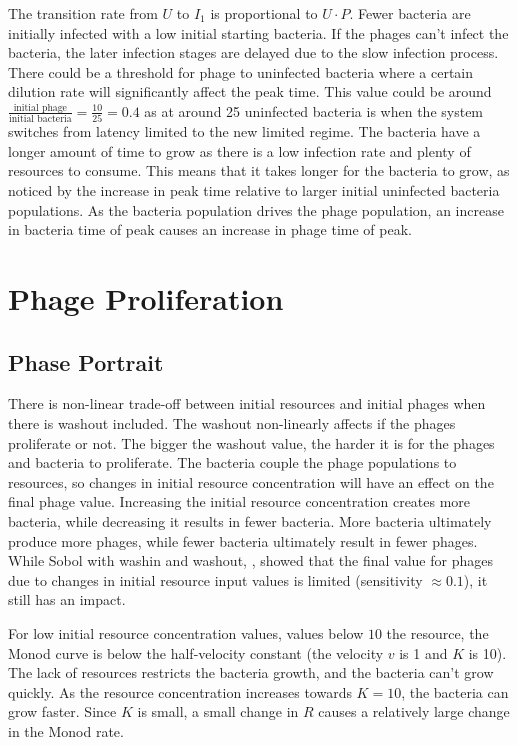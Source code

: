 The transition rate from $U$ to $I_1$ is proportional to $U\cdot P$. 
Fewer bacteria are initially infected with a low initial starting bacteria. 
If the phages can't infect the bacteria, the later infection stages are delayed due to the slow infection process. 
There could be a threshold for phage to uninfected bacteria where a certain dilution rate will significantly affect the peak time. 
This value could be around $\frac{\text{initial phage}}{\text{initial bacteria}} = \frac{10}{25} = 0.4$ as at around 25 uninfected bacteria is when the system switches from latency limited to the new limited regime. 
The bacteria have a longer amount of time to grow as there is a low infection rate and plenty of resources to consume. 
This means that it takes longer for the bacteria to grow, as noticed by the increase in peak time relative to larger initial uninfected bacteria populations. 
As the bacteria population drives the phage population, an increase in bacteria time of peak causes an increase in phage time of peak. 

\section{Phage Proliferation}
\subsection{Phase Portrait}
There is non-linear trade-off between initial resources and initial phages when there is washout included. 
The washout non-linearly affects if the phages proliferate or not. 
The bigger the washout value, the harder it is for the phages and bacteria to proliferate. 
The bacteria couple the phage populations to resources, so changes in initial resource concentration will have an effect on the final phage value. 
Increasing the initial resource concentration creates more bacteria, while decreasing it results in fewer bacteria.
More bacteria ultimately produce more phages, while fewer bacteria ultimately result in fewer phages.
While Sobol with washin and washout, , showed that the final value for phages due to changes in initial resource input values is limited (sensitivity $\approx 0.1$), it still has an impact. 

For low initial resource concentration values, values below $10$ the resource, the Monod curve is below the half-velocity constant (the velocity $v$ is 1 and $K$ is 10). 
The lack of resources restricts the bacteria growth, and the bacteria can't grow quickly. 
As the resource concentration increases towards $K=10$, the bacteria can grow faster. 
Since $K$ is small, a small change in $R$ causes a relatively large change in the Monod rate. 


